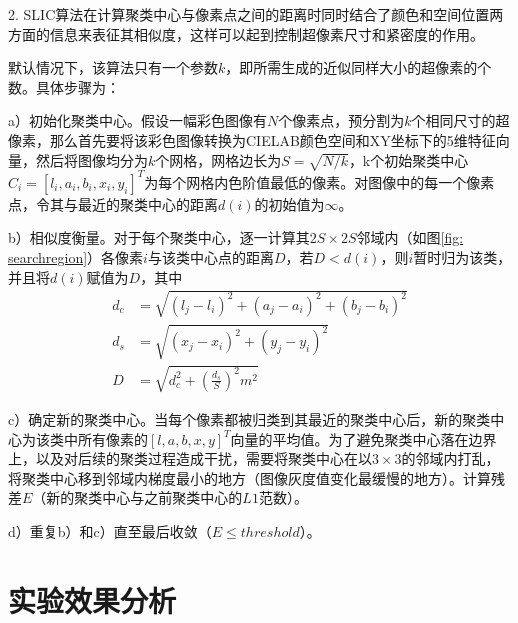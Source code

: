 \documentclass[12pt]{article}
\begin{document}
2. SLIC算法在计算聚类中心与像素点之间的距离时同时结合了颜色和空间位置两方面的信息来表征其相似度，这样可以起到控制超像素尺寸和紧密度的作用。

默认情况下，该算法只有一个参数$k$，即所需生成的近似同样大小的超像素的个数。具体步骤为：

a）初始化聚类中心。假设一幅彩色图像有$N$个像素点，预分割为$k$个相同尺寸的超像素，那么首先要将该彩色图像转换为CIELAB颜色空间和XY坐标下的5维特征向量，然后将图像均分为$k$个网格，网格边长为$S=\sqrt{N/k}$，k个初始聚类中心$C_i=[l_i, a_i, b_i, x_i, y_i]^T$为每个网格内色阶值最低的像素。对图像中的每一个像素点，令其与最近的聚类中心的距离$d(i)$的初始值为$\infty$。

b）相似度衡量。对于每个聚类中心，逐一计算其$2S \times 2S$邻域内（如图\ref{fig: searchregion}）各像素$i$与该类中心点的距离$D$，若$D<d(i)$，则$i$暂时归为该类，并且将$d(i)$赋值为$D$，其中
\begin{align}
d_c & =  \sqrt{(l_j-l_i)^2+(a_j-a_i)^2+(b_j-b_i)^2}\\
d_s & =  \sqrt{(x_j-x_i)^2+(y_j-y_i)^2}\\
D & =  \sqrt{d_c^2+\left(\frac{d_s}{S}\right)^2m^2}
\end{align}

c）确定新的聚类中心。当每个像素都被归类到其最近的聚类中心后，新的聚类中心为该类中所有像素的$[l, a, b, x, y]^T$向量的平均值。为了避免聚类中心落在边界上，以及对后续的聚类过程造成干扰，需要将聚类中心在以$3\times3$的邻域内打乱，将聚类中心移到邻域内梯度最小的地方（图像灰度值变化最缓慢的地方）。计算残差$E$（新的聚类中心与之前聚类中心的$L1$范数）。

d）重复b）和c）直至最后收敛（$E\le threshold$）。

\section{实验效果分析}






\end{document}
